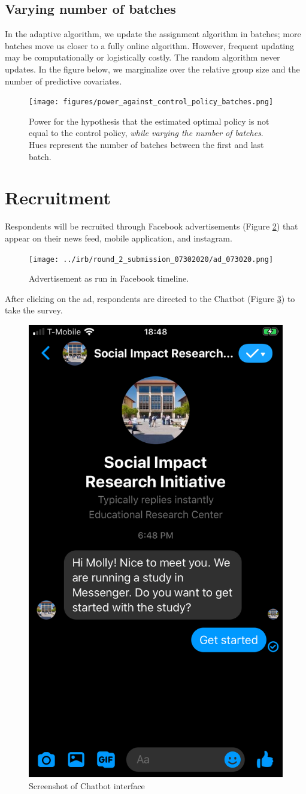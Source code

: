 \documentclass[letterpaper, 12pt, parskip=full,DIV=10]{scrartcl}
\begin{document}
\subsection{Varying number of batches}
In the adaptive algorithm, we update the assignment algorithm in batches; more batches move us closer to a fully online algorithm. However, frequent updating may be computationally or logistically costly. The random algorithm never updates. In the figure below, we marginalize over the relative group size and the number of predictive covariates. 

\begin{figure}[H]
\centering
\texttt{[image: figures/power\_against\_control\_policy\_batches.png]}
\caption{Power for the hypothesis that the estimated optimal policy is not equal to the control policy, \textit{while varying the number of batches}. Hues represent the number of batches between the first and last batch.}
\label{fig:power_control_batches}
\end{figure}


\clearpage


\clearpage
\appendix

\section{Recruitment}\label{appendix:recruitment}
Respondents will be recruited through Facebook advertisements (Figure \ref{fig:ad}) that appear on their news feed, mobile application, and instagram. 

\begin{figure}[htb]
\centering
\caption{Advertisement as run in Facebook timeline.}
\label{fig:ad}
\texttt{[image: ../irb/round\_2\_submission\_07302020/ad\_073020.png]}
\end{figure}

After clicking on the ad, respondents are directed to the Chatbot (Figure \ref{fig:chatbot}) to take the survey.

\begin{figure}[htb]
\centering
\caption{Screenshot of Chatbot interface}
\label{fig:chatbot}
\includegraphics[width=.25\textwidth]{figures/chatbot_image.png}
\end{figure}
\end{document}
